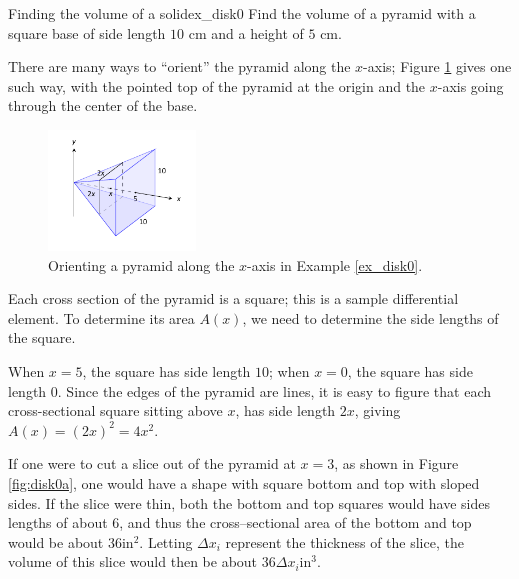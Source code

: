 \begin{example}{Finding the volume of a solid}{ex_disk0}
{
Find the volume of a pyramid with a square base of side length $ 10 $ cm and a height of $ 5 $ cm.}
\end{example}


\begin{solution}
{There are many ways to ``orient'' the pyramid along the $x$-axis; Figure \ref{fig:disk0} gives one such way, with the pointed top of the pyramid at the origin and the $x$-axis going through the center of the base.

\begin{figure}[H]
\centering
\includegraphics[width=0.35\textwidth]{figures/figcross_area1}
\caption{Orienting a pyramid along the $x$-axis in Example \ref{ex_disk0}.}
\label{fig:disk0}
\end{figure}


Each cross section of the pyramid is a square; this is a sample differential element. To determine its area $A(x)$, we need to determine the side lengths of the square.

When $x=5$, the square has side length $ 10 $; when $x=0$, the square has side length $ 0 $. Since the edges of the pyramid are lines, it is easy to figure that each cross-sectional square sitting above $ x $, has side length $2x$, giving $A(x) = (2x)^2=4x^2$. %

If one were to cut a slice out of the pyramid at $x=3$, as shown in Figure \ref{fig:disk0a}, one would have a shape with square bottom and top with sloped sides. If the slice were thin, both the bottom and top squares would have sides lengths of about 6, and thus the cross--sectional area of the bottom and top would be about 36in$^2$. Letting $\Delta x_i$ represent the thickness of the slice, the volume of this slice would then be about $36\Delta x_i$in$^3$. 

}
\end{solution}
